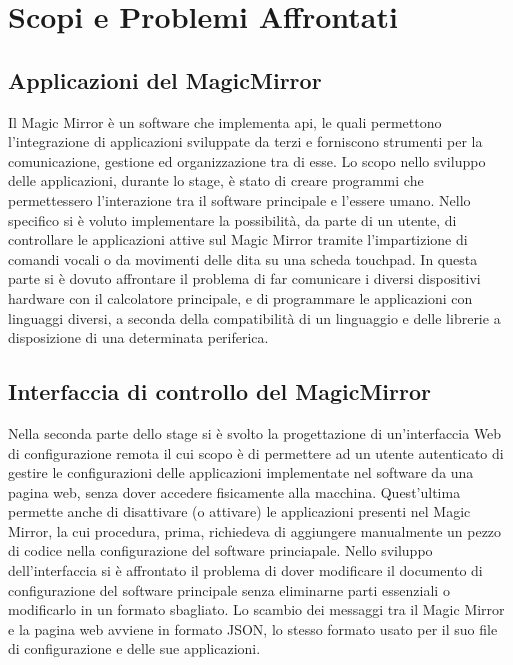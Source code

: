 \chapter{Scopi e Problemi Affrontati}

\section{Applicazioni del MagicMirror}
Il Magic Mirror \`e un software che implementa api, le quali permettono
l'integrazione di applicazioni sviluppate da terzi e forniscono strumenti per la comunicazione, gestione
ed organizzazione tra di esse.
Lo scopo nello sviluppo delle applicazioni, durante lo stage, \`e stato
di creare programmi che permettessero l'interazione tra il software principale
e l'essere umano. Nello specifico si \`e voluto implementare la possibilit\`a, da parte di un utente,
di controllare le applicazioni attive sul Magic Mirror tramite l'impartizione di comandi vocali
o da movimenti delle dita su una scheda touchpad.
In questa parte si \`e dovuto affrontare il problema di far comunicare
i diversi dispositivi hardware con il calcolatore principale, e di programmare
le applicazioni con linguaggi diversi, a seconda della compatibilit\`a di un linguaggio
e delle librerie a disposizione di una determinata periferica.
\\[2\baselineskip]
\section{Interfaccia di controllo del MagicMirror}
Nella seconda parte dello stage si \`e svolto la progettazione di un'interfaccia Web di configurazione remota
il cui scopo \`e di permettere ad un utente autenticato di gestire
le configurazioni delle applicazioni implementate nel software da una pagina web,
senza dover accedere fisicamente alla macchina.
Quest'ultima permette anche di disattivare (o attivare) le applicazioni presenti nel Magic Mirror,
la cui procedura, prima, richiedeva di aggiungere manualmente un pezzo di codice nella
configurazione del software princiapale.
Nello sviluppo dell'interfaccia si \`e affrontato il problema di dover modificare
il documento di configurazione del software principale senza eliminarne parti essenziali
o modificarlo in un formato sbagliato.
Lo scambio dei messaggi tra il Magic Mirror e la pagina web avviene in formato JSON, lo stesso formato
usato per il suo file di configurazione e delle sue applicazioni.\\
